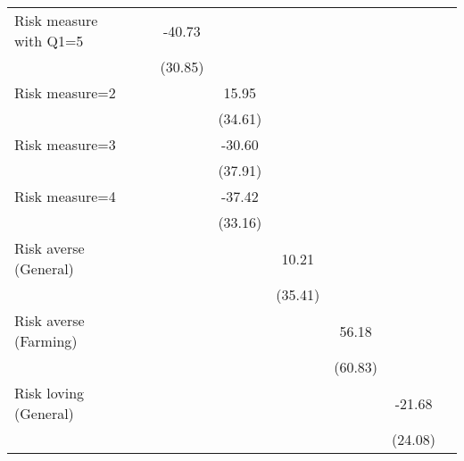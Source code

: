 \begin{table}[htbp]
\begin{threeparttable}
\begin{tabular}{l cccccccc}
Risk measure with Q1=5&               &               &      -40.73   &               &               &               &               &               \\
                    &               &               &     (30.85)   &               &               &               &               &               \\
Risk measure=2      &               &               &               &       15.95   &               &               &               &               \\
                    &               &               &               &     (34.61)   &               &               &               &               \\
Risk measure=3      &               &               &               &      -30.60   &               &               &               &               \\
                    &               &               &               &     (37.91)   &               &               &               &               \\
Risk measure=4      &               &               &               &      -37.42   &               &               &               &               \\
                    &               &               &               &     (33.16)   &               &               &               &               \\
Risk averse (General)&               &               &               &               &       10.21   &               &               &               \\
                    &               &               &               &               &     (35.41)   &               &               &               \\
Risk averse (Farming)&               &               &               &               &               &       56.18   &               &               \\
                    &               &               &               &               &               &     (60.83)   &               &               \\
Risk loving (General)&               &               &               &               &               &               &      -21.68   &               \\
                    &               &               &               &               &               &               &     (24.08)   &               \\

\end{tabular}
\end{threeparttable}
\end{table}
